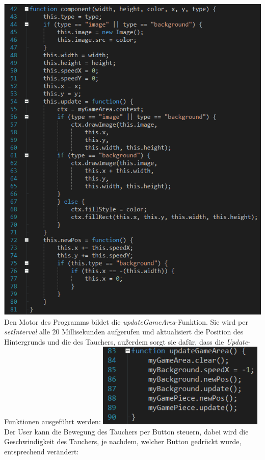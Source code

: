 \includegraphics[width=1\textwidth]{img/vincent/abb06.png}
\newline
Den Motor des Programms bildet die \textit{updateGameArea}-Funktion. Sie wird per \textit{setInterval} alle 20 Millisekunden aufgerufen und aktualisiert die Position des Hintergrunds und die des Tauchers, außerdem sorgt sie daf\"ur, dass die \textit{Update}-Funktionen ausgef\"uhrt werden:
\newline
\includegraphics[width=0.6\textwidth]{img/vincent/abb07.png}
\newline
Der User kann die Bewegung des Tauchers per Button steuern, dabei wird die Geschwindigkeit des Tauchers, je nachdem, welcher Button gedr\"uckt wurde, entsprechend ver\"andert:
